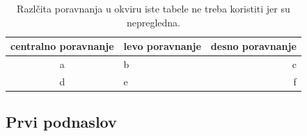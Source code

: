 \documentclass[a4paper]{article}
\begin{document}
\begin{table}[h!]
\begin{center}
\caption{Razlčita poravnanja u okviru iste tabele ne treba koristiti jer su nepregledna.}
\begin{tabular}{|c|l|r|} \hline
centralno poravnanje& levo poravnanje& desno poravnanje\\ \hline
a &b&c\\ \hline
d &e&f\\ \hline
\end{tabular}
\label{tab:tabela1}
\end{center}
\end{table}


\subsection{Prvi podnaslov}
\label{subsec:podnaslov1}


\appendix
 


\appendix
\end{document}
